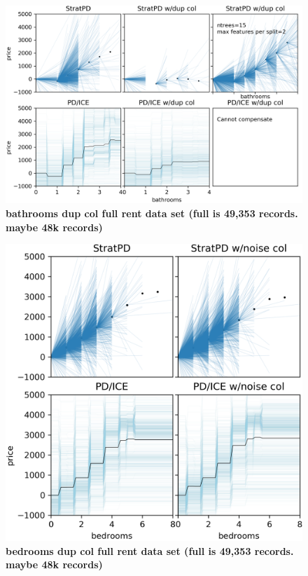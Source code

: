 \documentclass[12pt]{article}
\begin{document}
\begin{figure}[htbp]
\begin{center}
\includegraphics[scale=0.6]{images/bathrooms_vs_price_dup.png}
\caption{{\bf  bathrooms dup col full rent data set (full is 49,353 records. maybe 48k records)}}
\label{fig:baths_dup}
\end{center}
\end{figure}

\begin{figure}[htbp]
\begin{center}
\includegraphics[scale=0.6]{images/bedrooms_vs_price_noise.png}
\caption{{\bf  bedrooms dup col full rent data set (full is 49,353 records. maybe 48k records)}}
\label{fig:beds_noise}
\end{center}
\end{figure}
\end{document}

